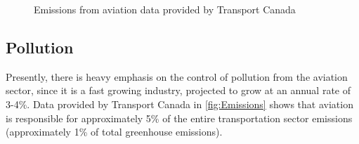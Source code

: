 \documentclass{aer1315-pretty}
\begin{document}
\begin{figure}[!h]%
	\:
    \caption{Emissions from aviation data provided by Transport Canada \cite{TransportCanada}}  
\end{figure}

\subsection{Pollution}

Presently, there is heavy emphasis on the control of pollution from the aviation sector, since it is a fast growing industry, projected to grow at an annual rate of 3-4\%. Data provided by Transport Canada \cite{TransportCanada} in \ref{fig:Emissions} shows that aviation is responsible for approximately 5\% of the entire transportation sector emissions (approximately 1\% of total greenhouse emissions).\par  
\end{document}
